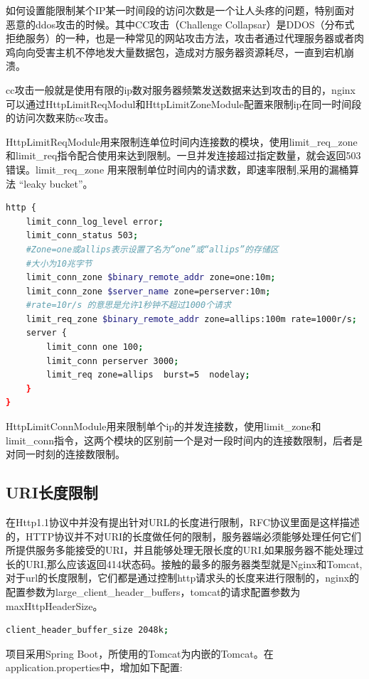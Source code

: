 \documentclass[letter]{book}
\begin{document}
如何设置能限制某个IP某一时间段的访问次数是一个让人头疼的问题，特别面对恶意的ddos攻击的时候。其中CC攻击（Challenge Collapsar）是DDOS（分布式拒绝服务）的一种，也是一种常见的网站攻击方法，攻击者通过代理服务器或者肉鸡向向受害主机不停地发大量数据包，造成对方服务器资源耗尽，一直到宕机崩溃。

cc攻击一般就是使用有限的ip数对服务器频繁发送数据来达到攻击的目的，nginx可以通过HttpLimitReqModul和HttpLimitZoneModule配置来限制ip在同一时间段的访问次数来防cc攻击。

HttpLimitReqModule用来限制连单位时间内连接数的模块，使用limit\_req\_zone和limit\_req指令配合使用来达到限制。一旦并发连接超过指定数量，就会返回503错误。limit\_req\_zone 用来限制单位时间内的请求数，即速率限制,采用的漏桶算法 “leaky bucket”。

\begin{lstlisting}[language=bash]
http {
	limit_conn_log_level error;
	limit_conn_status 503;
	#Zone=one或allips表示设置了名为“one”或“allips”的存储区
	#大小为10兆字节
	limit_conn_zone $binary_remote_addr zone=one:10m;
	limit_conn_zone $server_name zone=perserver:10m;
	#rate=10r/s 的意思是允许1秒钟不超过1000个请求
	limit_req_zone $binary_remote_addr zone=allips:100m rate=1000r/s;  
	server {
		limit_conn one 100;
		limit_conn perserver 3000;
		limit_req zone=allips  burst=5  nodelay;
	}
}
\end{lstlisting}

HttpLimitConnModule用来限制单个ip的并发连接数，使用limit\_zone和limit\_conn指令，这两个模块的区别前一个是对一段时间内的连接数限制，后者是对同一时刻的连接数限制。

\subsection{URI长度限制}

在Http1.1协议中并没有提出针对URL的长度进行限制，RFC协议里面是这样描述的，HTTP协议并不对URI的长度做任何的限制，服务器端必须能够处理任何它们所提供服务多能接受的URI，并且能够处理无限长度的URI,如果服务器不能处理过长的URI,那么应该返回414状态码。接触的最多的服务器类型就是Nginx和Tomcat,对于url的长度限制，它们都是通过控制http请求头的长度来进行限制的，nginx的配置参数为large\_client\_header\_buffers，tomcat的请求配置参数为maxHttpHeaderSize。

\begin{lstlisting}[language=bash]
client_header_buffer_size 2048k;
\end{lstlisting}

项目采用Spring Boot，所使用的Tomcat为内嵌的Tomcat。在application.properties中，增加如下配置:
\end{document}
